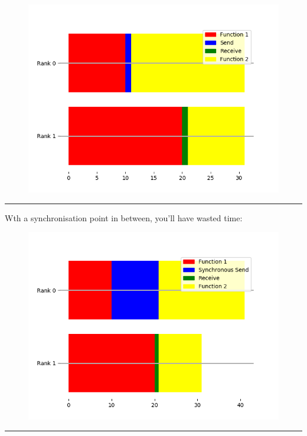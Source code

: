 \begin{figure}[htbp]
\centering
\includegraphics{06MPI/figures/efficient.png}
\end{figure}

\begin{center}\rule{3in}{0.4pt}\end{center}

Wth a synchronisation point in between, you'll have wasted time:

\begin{figure}[htbp]
\centering
\includegraphics{06MPI/figures/inefficient.png}
\end{figure}

\begin{center}\rule{3in}{0.4pt}\end{center}

